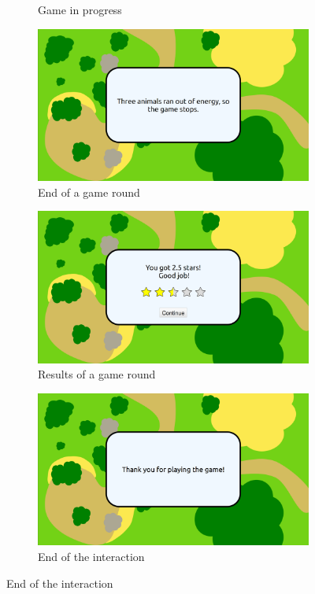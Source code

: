 \begin{figure}[ht]
\begin{subfigure}[b]{0.325\textwidth}
		\caption{Game in progress}
		\label{fig:tuto_game}
	\end{subfigure}	
		\centering
		\begin{subfigure}[b]{0.325\textwidth}
		\centering
		\includegraphics[width=\textwidth]{game_sequence/endgame.png}
		\caption{End of a game round}
		\label{fig:tuto_endgame}
	\end{subfigure}	
	\centering
	\begin{subfigure}[b]{0.325\textwidth}
		\centering
		\includegraphics[width=\textwidth]{game_sequence/resultgame.png}
		\caption{Results of a game round}
		\label{fig:tuto_result_game}
	\end{subfigure}	
	\centering
	\begin{subfigure}[b]{0.325\textwidth}
		\centering
		\includegraphics[width=\textwidth]{game_sequence/end.png}
		\caption{End of the interaction}
		\label{fig:tuto_end}
	\end{subfigure}	
	

\end{figure}
